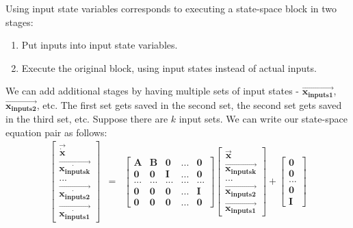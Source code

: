     Using input state variables corresponds to executing a state-space
block in two stages:
\begin{enumerate}
\item Put inputs into input state variables.

\item Execute the original block, using input states instead of
actual inputs.
\end{enumerate}

    We can add additional stages by having multiple sets of input
states - $\vec{\mathbf{x_{inputs1}}}$,
$\vec{\mathbf{x_{inputs2}}}$, etc. The first set gets saved in the
second set, the second set gets saved in the third set, etc.
Suppose there are $k$ input sets. We can write our state-space
equation pair as follows:
\begin{eqnarray*}
\left [ \begin{array} {c} \vec{\dot{\mathbf{x}}} \\ \vec{\dot{\mathbf{x_{inputsk}}}} \\
... \\ \vec{\dot{\mathbf{x_{inputs2}}}} \\
\vec{\dot{\mathbf{x_{inputs1}}}}
\end{array} \right ] & = & \left [ \begin{array} {ccccc}
\mathbf{A} & \mathbf{B} & \mathbf{0} & ... &
\mathbf{0} \\ \mathbf{0} & \mathbf{0} & \mathbf{I} & ... & \mathbf{0} \\
... & ... & ... & ... & ... \\ \mathbf{0} & \mathbf{0} &
\mathbf{0} & ... & \mathbf{I} \\ \mathbf{0} & \mathbf{0} &
\mathbf{0} & ... & \mathbf{0} \end{array} \right ] \left [
\begin{array} {c} \vec{\mathbf{x}} \\ \vec{\mathbf{x_{inputsk}}} \\ ...
\\ \vec{\mathbf{x_{inputs2}}} \\ \vec{\mathbf{x_{inputs1}}} \end{array} \right ]
+ \left [ \begin{array} {c} \mathbf{0} \\ \mathbf{0} \\ ... \\
\mathbf{0} \\ \mathbf{I} \end{array} \right ]

\end{eqnarray*}
